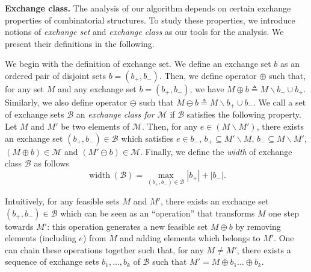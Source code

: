 \documentclass{article}
\newcommand{\junk}[1]{}
\newcommand{\M}{\mathcal M}
\newcommand{\B}{\mathcal B}
\newcommand{\del}{\backslash}
\DeclareMathOperator{\rank}{width}
\newcommand{\MultiIdent}{\textbf{Multi}\xspace}
\newcommand{\Matroid}{\textbf{Matroid}\xspace}
\newcommand{\Match}{\textbf{Match}\xspace}
\begin{document}
\begin{spacing}{1.1}
\textbf{Exchange class.} 
The analysis of our algorithm depends on certain exchange properties of combinatorial structures.
To study these properties, we introduce notions of \emph{exchange set} and \emph{exchange class} as our tools for the analysis.
We present their definitions in the following.


We begin with the definition of exchange set. 
We define an exchange set $b$ as an ordered pair of disjoint sets $b=(b_+,b_-)$.
Then, we define operator $\oplus$ such that, for any set $M$ and any exchange set $b=(b_+,b_-)$, we have $M\oplus b \triangleq M\del b_- \cup b_+$.
Similarly, we also define operator $\ominus$ such that $M\ominus b \triangleq M\del b_+\cup b_-$.
We call a set of exchange sets $\B$ an \emph{exchange class for $\M$} if $\B$ satisfies the following property.
Let $M$ and $M'$ be two  elements of $\M$.
Then, for any $e \in (M\del M')$, there exists an exchange set $(b_+,b_-)\in \B$ which satisfies $e\in b_-$, $b_+ \subseteq M'\del M$, $b_- \subseteq M \del M'$, $(M\oplus b) \in \M$ and $(M'\ominus b) \in \M$.
Finally, we define the \emph{width} of exchange class $\B$ as follows
$$
\rank(\B) = \max_{(b_+,b_-) \in \B} |b_+|+|b_-|.
$$


Intuitively, for any feasible sets $M$ and $M'$, there exists an exchange set $(b_+,b_-)\in \B$ which can be seen as an ``operation'' that transforms $M$ one step towards $M'$: this operation generates a new feasible set $M\oplus b$ by removing elements (including $e$) from $M$ and adding elements which belongs to $M'$.
One can chain these operations together such that, for any $M\not= M'$, there exists a sequence of exchange sets $b_1,\ldots, b_k$ of $\B$ such that $M'=M\oplus b_1 \ldots \oplus b_k$.


\junk{
Next, we investigate the exchange classes for our running examples.
For \MultiIdent problem, we can construct the exchange class as $\B_{1}=\{(\{i\},\{j\})\;|\;\forall i\in [n], j\in [n]\}$.
It is easy to verify $\B_{1}$ is an exchange class for $\M_{\MultiIdent}$: one can transform a set of $k$ elements to another by adding and removing an element for each time.
In fact, a standard result from matroid theory, called basis exchange property (see Lemma~\ref{lemma:basis-exchange-matroid} in the appendix), shows that $\B_1$ is also an exchange class for the more general \Matroid problem.
Next, for \Match problem, an exchange class contains all cycles of the graph $G$.
Given two matchings $M,M'$, the union $M\cup M'$ is a union of disjoint cycles [].
These cycles are known to be augmenting cycles in combinatorial optimization literature [].
Figure~Y illustrates these exchanges classes.
}


\end{spacing}
\end{document}
